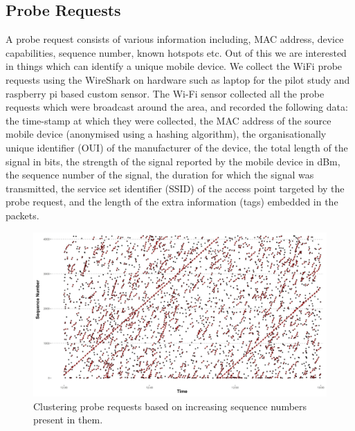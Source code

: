 \lipsum[1]

\subsection{Probe Requests}
A probe request consists of various information including, MAC address, device capabilities, sequence number, known hotspots etc.
Out of this we are interested in things which can identify a unique mobile device.
We collect the WiFi probe requests using the WireShark on hardware such as laptop for the pilot study and raspberry pi based custom sensor.
The Wi-Fi sensor collected all the probe requests which were broadcast around the area, and recorded the following data: the time-stamp at which they were collected, the MAC address of the source mobile device (anonymised using a hashing algorithm), the organisationally unique identifier (OUI) of the manufacturer of the device, the total length of the signal in bits, the strength of the signal reported by the mobile device in dBm, the sequence number of the signal, the duration for which the signal was transmitted, the service set identifier (SSID) of the access point targeted by the probe request, and the length of the extra information (tags) embedded in the packets.
	\begin{figure}
		\begin{center}
			\includegraphics [width=\linewidth,trim=4 4 4 4,clip] {images/methodology_clustering.png}
			\caption{Clustering probe requests based on increasing sequence numbers present in them.}
			\label{clustering_pilot}
		\end{center}
	\end{figure}


